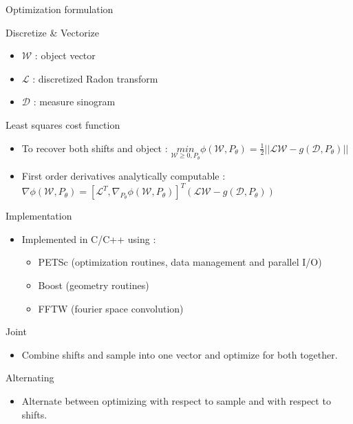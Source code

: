 \documentclass[aspectratio=43]{beamer}
\begin{document}
\begin{frame}{Optimization formulation}
	\begin{block}{Discretize \& Vectorize}
		\begin{itemize}
			\item $\mathcal{W}$ : object vector
			\item $\mathcal{L}$ : discretized Radon transform
			\item $\mathcal{D}$ : measure sinogram
		\end{itemize}
	\end{block}
	\begin{exampleblock}{Least squares cost function}
		\begin{itemize}
			\item To recover both shifts and object : 
			$\underset{\mathcal{W} \geq 0, P_{\theta}}{\textit{min}}  \phi(\mathcal{W},P_{\theta}) = \frac{1}{2}||\mathcal{L}\mathcal{W} - g(\mathcal{D},P_{\theta})||$
			\item First order derivatives analytically computable :
			$ \nabla \phi(\mathcal{W},P_{\theta}) = [\mathcal{L}^{T},
			\nabla_{P_{\theta}} \phi(\mathcal{W},P_{\theta})]^{T} (\mathcal{L}\mathcal{W} - g(\mathcal{D},P_{\theta}))$
		\end{itemize}
	\end{exampleblock}
\end{frame}

\begin{frame}{Implementation}
	\begin{block}{}
		\begin{itemize}
			\item Implemented in C/C++ using :
			\begin{itemize}
				\item PETSc (optimization routines, data management and parallel I/O)
				\item Boost (geometry routines) 
				\item FFTW (fourier space convolution)
			\end{itemize}
		\end{itemize}
	\end{block}
	\begin{block}{Joint}
		\begin{itemize}
			\item Combine shifts and sample into one vector and optimize for both together.
		\end{itemize}
	\end{block}
	\begin{exampleblock}{Alternating}
		\begin{itemize}
			\item Alternate between optimizing with respect to sample and with respect to shifts.
		\end{itemize}
	\end{exampleblock}
\end{frame}
\end{document}
